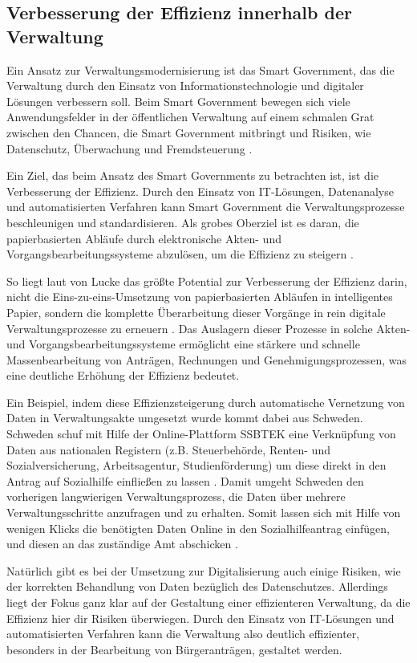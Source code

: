 \subsection{Verbesserung der Effizienz innerhalb der Verwaltung}
Ein Ansatz zur Verwaltungsmodernisierung ist das Smart Government, das die Verwaltung durch den Einsatz von Informationstechnologie und digitaler Lösungen verbessern soll.
Beim Smart Government bewegen sich viele Anwendungsfelder in der öffentlichen Verwaltung auf einem schmalen Grat zwischen den Chancen, die Smart Government mitbringt und Risiken, wie Datenschutz, Überwachung und Fremdsteuerung \citep[Vgl.][]{Lucke2018}.
\par
Ein Ziel, das beim Ansatz des Smart Governments zu betrachten ist, ist die Verbesserung der Effizienz.
Durch den Einsatz von IT-Lösungen, Datenanalyse und automatisierten Verfahren kann Smart Government die Verwaltungsprozesse beschleunigen und standardisieren. 
Als grobes Oberziel ist es daran, die papierbasierten Abläufe durch elektronische Akten- und Vorgangsbearbeitungssysteme abzulösen, um die Effizienz zu steigern \citep[][]{von_Lucke_2016}.
\par
So liegt laut von Lucke das größte Potential zur Verbesserung der Effizienz darin, nicht die Eins-zu-eins-Umsetzung von papierbasierten Abläufen in intelligentes Papier, sondern die komplette Überarbeitung dieser Vorgänge in rein digitale Verwaltungsprozesse zu erneuern \citep[][S.179]{von_Lucke_2016}.
Das Auslagern dieser Prozesse in solche Akten- und Vorgangsbearbeitungssysteme ermöglicht eine stärkere und schnelle Massenbearbeitung von Anträgen, Rechnungen und Genehmigungsprozessen, was eine deutliche Erhöhung der Effizienz bedeutet.
\par
Ein Beispiel, indem diese Effizienzsteigerung durch automatische Vernetzung von Daten in Verwaltungsakte umgesetzt wurde kommt dabei aus Schweden.
Schweden schuf mit Hilfe der Online-Plattform SSBTEK eine Verknüpfung von Daten aus nationalen Registern (z.B. Steuerbehörde, Renten- und Sozialversicherung, Arbeitsagentur, Studienförderung) um diese direkt in den Antrag auf Sozialhilfe einfließen zu lassen \citep[][]{bitkom2023}.
Damit umgeht Schweden den vorherigen langwierigen Verwaltungsprozess, die Daten über mehrere Verwaltungsschritte anzufragen und zu erhalten.
Somit lassen sich mit Hilfe von wenigen Klicks die benötigten Daten Online in den Sozialhilfeantrag einfügen, und diesen an das zuständige Amt abschicken \citep[][]{NationalenNormenkontrollrat2017}.
\par
Natürlich gibt es bei der Umsetzung zur Digitalisierung auch einige Risiken, wie der korrekten Behandlung von Daten bezüglich des Datenschutzes.
Allerdings liegt der Fokus ganz klar auf der Gestaltung einer effizienteren Verwaltung, da die Effizienz hier dir Risiken überwiegen.
Durch den Einsatz von IT-Lösungen und automatisierten Verfahren kann die Verwaltung also deutlich effizienter, besonders in der Bearbeitung von Bürgeranträgen, gestaltet werden.
